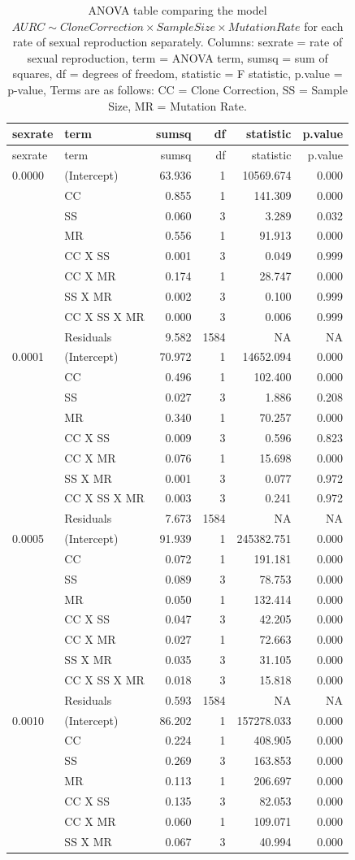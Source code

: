 \documentclass[]{article}
\theoremstyle{definition}
\theoremstyle{definition}
\theoremstyle{definition}
\theoremstyle{remark}
\begin{document}
\setcounter{table}{0} \renewcommand{\thetable}{S\arabic{table}}

\begin{longtable}[]{@{}llrrrr@{}}
\caption{\label{tab:sim3} ANOVA table comparing the model
\(AURC \sim Clone Correction \times Sample Size \times Mutation Rate\)
for each rate of sexual reproduction separately. Columns: sexrate = rate
of sexual reproduction, term = ANOVA term, sumsq = sum of squares, df =
degrees of freedom, statistic = F statistic, p.value = p-value, Terms
are as follows: CC = Clone Correction, SS = Sample Size, MR = Mutation
Rate.}\tabularnewline
\toprule
sexrate & term & sumsq & df & statistic & p.value\tabularnewline
\midrule
\endfirsthead
\toprule
sexrate & term & sumsq & df & statistic & p.value\tabularnewline
\midrule
\endhead
0.0000 & (Intercept) & 63.936 & 1 & 10569.674 & 0.000\tabularnewline
& CC & 0.855 & 1 & 141.309 & 0.000\tabularnewline
& SS & 0.060 & 3 & 3.289 & 0.032\tabularnewline
& MR & 0.556 & 1 & 91.913 & 0.000\tabularnewline
& CC X SS & 0.001 & 3 & 0.049 & 0.999\tabularnewline
& CC X MR & 0.174 & 1 & 28.747 & 0.000\tabularnewline
& SS X MR & 0.002 & 3 & 0.100 & 0.999\tabularnewline
& CC X SS X MR & 0.000 & 3 & 0.006 & 0.999\tabularnewline
& Residuals & 9.582 & 1584 & NA & NA\tabularnewline
0.0001 & (Intercept) & 70.972 & 1 & 14652.094 & 0.000\tabularnewline
& CC & 0.496 & 1 & 102.400 & 0.000\tabularnewline
& SS & 0.027 & 3 & 1.886 & 0.208\tabularnewline
& MR & 0.340 & 1 & 70.257 & 0.000\tabularnewline
& CC X SS & 0.009 & 3 & 0.596 & 0.823\tabularnewline
& CC X MR & 0.076 & 1 & 15.698 & 0.000\tabularnewline
& SS X MR & 0.001 & 3 & 0.077 & 0.972\tabularnewline
& CC X SS X MR & 0.003 & 3 & 0.241 & 0.972\tabularnewline
& Residuals & 7.673 & 1584 & NA & NA\tabularnewline
0.0005 & (Intercept) & 91.939 & 1 & 245382.751 & 0.000\tabularnewline
& CC & 0.072 & 1 & 191.181 & 0.000\tabularnewline
& SS & 0.089 & 3 & 78.753 & 0.000\tabularnewline
& MR & 0.050 & 1 & 132.414 & 0.000\tabularnewline
& CC X SS & 0.047 & 3 & 42.205 & 0.000\tabularnewline
& CC X MR & 0.027 & 1 & 72.663 & 0.000\tabularnewline
& SS X MR & 0.035 & 3 & 31.105 & 0.000\tabularnewline
& CC X SS X MR & 0.018 & 3 & 15.818 & 0.000\tabularnewline
& Residuals & 0.593 & 1584 & NA & NA\tabularnewline
0.0010 & (Intercept) & 86.202 & 1 & 157278.033 & 0.000\tabularnewline
& CC & 0.224 & 1 & 408.905 & 0.000\tabularnewline
& SS & 0.269 & 3 & 163.853 & 0.000\tabularnewline
& MR & 0.113 & 1 & 206.697 & 0.000\tabularnewline
& CC X SS & 0.135 & 3 & 82.053 & 0.000\tabularnewline
& CC X MR & 0.060 & 1 & 109.071 & 0.000\tabularnewline
& SS X MR & 0.067 & 3 & 40.994 & 0.000\tabularnewline

\end{longtable}
\end{document}
